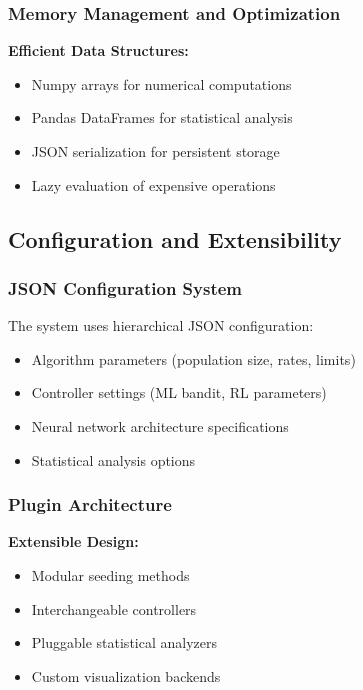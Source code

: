 \documentclass[12pt,a4paper]{article}
\begin{document}
\subsubsection{Memory Management and Optimization}
\textbf{Efficient Data Structures:}
\begin{itemize}
\item Numpy arrays for numerical computations
\item Pandas DataFrames for statistical analysis
\item JSON serialization for persistent storage
\item Lazy evaluation of expensive operations
\end{itemize}

\subsection{Configuration and Extensibility}

\subsubsection{JSON Configuration System}
The system uses hierarchical JSON configuration:
\begin{itemize}
\item Algorithm parameters (population size, rates, limits)
\item Controller settings (ML bandit, RL parameters)
\item Neural network architecture specifications
\item Statistical analysis options
\end{itemize}

\subsubsection{Plugin Architecture}
\textbf{Extensible Design:}
\begin{itemize}
\item Modular seeding methods
\item Interchangeable controllers
\item Pluggable statistical analyzers
\item Custom visualization backends
\end{itemize}
\end{document}
